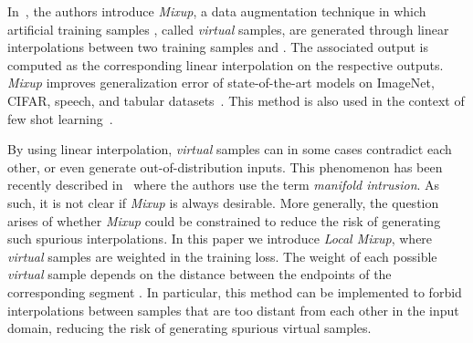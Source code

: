 \documentclass[twoside]{article}
\numberwithin{intassumption}{assumption}
\begin{document}
In~\citep{zhang2017mixup}, the authors introduce \emph{Mixup}, a data augmentation technique in which artificial training samples , called \emph{virtual} samples, are generated through linear interpolations between two training samples  and . The associated output is computed as the corresponding linear interpolation on the respective outputs. \emph{Mixup} improves generalization error of state-of-the-art models on ImageNet, CIFAR, speech, and tabular datasets~\citep{zhang2017mixup}. This method is also used in the context of few shot learning~\citep{fewshot1,fewshot2}. 
















By using linear interpolation, \emph{virtual} samples can in some cases contradict each other, or even generate out-of-distribution inputs. This phenomenon has been recently described in~\citep{guo2019mixup} where the authors use the term \emph{manifold intrusion}. As such, it is not clear if \emph{Mixup} is always desirable. More generally, the question arises of whether \emph{Mixup} could be constrained to reduce the risk of generating such spurious interpolations. In this paper we introduce \emph{Local Mixup}, where \emph{virtual} samples are weighted in the training loss. The weight of each possible \emph{virtual} sample depends on the distance between the endpoints of the corresponding segment . In particular, this method can be implemented to forbid interpolations between samples that are too distant from each other in the input domain, reducing the risk of generating spurious virtual samples.
\end{document}
